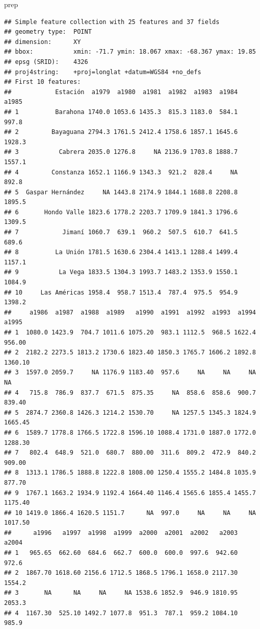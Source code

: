 \documentclass[11pt,]{article}
\newenvironment{Shaded}{\begin{snugshade}}{\end{snugshade}}
\newcommand{\NormalTok}[1]{#1}
\begin{document}
\begin{Shaded}
\begin{Highlighting}[]
\NormalTok{prep}
\end{Highlighting}
\end{Shaded}

\begin{verbatim}
## Simple feature collection with 25 features and 37 fields
## geometry type:  POINT
## dimension:      XY
## bbox:           xmin: -71.7 ymin: 18.067 xmax: -68.367 ymax: 19.85
## epsg (SRID):    4326
## proj4string:    +proj=longlat +datum=WGS84 +no_defs
## First 10 features:
##            Estación  a1979  a1980  a1981  a1982  a1983  a1984  a1985
## 1          Barahona 1740.0 1053.6 1435.3  815.3 1183.0  584.1  997.8
## 2         Bayaguana 2794.3 1761.5 2412.4 1758.6 1857.1 1645.6 1928.3
## 3           Cabrera 2035.0 1276.8     NA 2136.9 1703.8 1888.7 1557.1
## 4         Constanza 1652.1 1166.9 1343.3  921.2  828.4     NA  892.8
## 5  Gaspar Hernández     NA 1443.8 2174.9 1844.1 1688.8 2208.8 1895.5
## 6       Hondo Valle 1823.6 1778.2 2203.7 1709.9 1841.3 1796.6 1309.5
## 7            Jimaní 1060.7  639.1  960.2  507.5  610.7  641.5  689.6
## 8          La Unión 1781.5 1630.6 2304.4 1413.1 1288.4 1499.4 1157.1
## 9           La Vega 1833.5 1304.3 1993.7 1483.2 1353.9 1550.1 1084.9
## 10     Las Américas 1958.4  958.7 1513.4  787.4  975.5  954.9 1398.2
##     a1986  a1987  a1988  a1989   a1990  a1991  a1992  a1993  a1994   a1995
## 1  1080.0 1423.9  704.7 1011.6 1075.20  983.1 1112.5  968.5 1622.4  956.00
## 2  2182.2 2273.5 1813.2 1730.6 1823.40 1850.3 1765.7 1606.2 1892.8 1360.10
## 3  1597.0 2059.7     NA 1176.9 1183.40  957.6     NA     NA     NA      NA
## 4   715.8  786.9  837.7  671.5  875.35     NA  858.6  858.6  900.7  839.40
## 5  2874.7 2360.8 1426.3 1214.2 1530.70     NA 1257.5 1345.3 1824.9 1665.45
## 6  1589.7 1778.8 1766.5 1722.8 1596.10 1088.4 1731.0 1887.0 1772.0 1288.30
## 7   802.4  648.9  521.0  680.7  880.00  311.6  809.2  472.9  840.2  909.00
## 8  1313.1 1786.5 1888.8 1222.8 1808.00 1250.4 1555.2 1484.8 1035.9  877.70
## 9  1767.1 1663.2 1934.9 1192.4 1664.40 1146.4 1565.6 1855.4 1455.7 1175.40
## 10 1419.0 1866.4 1620.5 1151.7      NA  997.0     NA     NA     NA 1017.50
##      a1996   a1997  a1998  a1999  a2000  a2001  a2002   a2003  a2004
## 1   965.65  662.60  684.6  662.7  600.0  600.0  997.6  942.60  972.6
## 2  1867.70 1618.60 2156.6 1712.5 1868.5 1796.1 1658.0 2117.30 1554.2
## 3       NA      NA     NA     NA 1538.6 1852.9  946.9 1810.95 2053.3
## 4  1167.30  525.10 1492.7 1077.8  951.3  787.1  959.2 1084.10  985.9

\end{verbatim}
\end{document}
